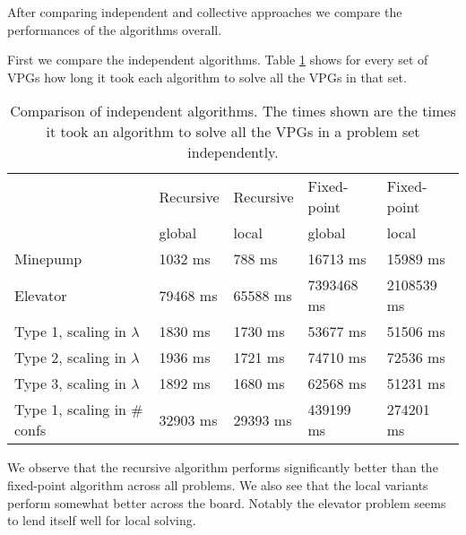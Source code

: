 After comparing independent and collective approaches we compare the performances of the algorithms overall.

First we compare the independent algorithms. Table \ref{tab_compare_independent_algs} shows for every set of VPGs how long it took each algorithm to solve all the VPGs in that set.
\begin{table}[h]
	\centering
	\begin{tabular}{|l|l|l|l|l|}
		\hline
		& Recursive &Recursive & Fixed-point & Fixed-point\\
		& global & local & global & local \\
		\hline
		Minepump& 1032 ms& 788 ms& 16713 ms& 15989 ms\\ \hline
		Elevator& 79468 ms& 65588 ms& 7393468 ms& 2108539 ms\\ \hline
		Type 1, scaling in $\lambda$& 1830 ms& 1730 ms& 53677 ms& 51506 ms\\ \hline
		Type 2, scaling in $\lambda$& 1936 ms& 1721 ms& 74710 ms& 72536 ms\\ \hline
		Type 3, scaling in $\lambda$& 1892 ms& 1680 ms& 62568 ms& 51231 ms\\ \hline
		Type 1, scaling in \# confs& 32903 ms& 29393 ms& 439199 ms& 274201 ms\\ \hline
	\end{tabular}
	\caption{Comparison of independent algorithms. The times shown are the times it took an algorithm to solve all the VPGs in a problem set independently.}
	\label{tab_compare_independent_algs}
\end{table}
We observe that the recursive algorithm performs significantly better than the fixed-point algorithm across all problems. We also see that the local variants perform somewhat better across the board. Notably the elevator problem seems to lend itself well for local solving.

